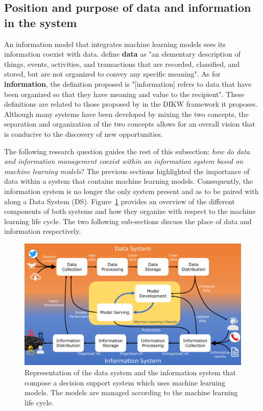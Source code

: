 \subsection{Position and purpose of data and information in the system}
An information model that integrates machine learning models sees its information coexist with data.
\textcite{rainerIntroductionInformationSystems2021} define \textbf{data} as "an elementary description
of things, events, activities, and transactions that are recorded, classified, and stored,
but are not organized to convey any specific meaning".
As for \textbf{information}, the definition proposed is "[information] refers to data
that have been organized so that they have meaning and value to the recipient".
These definitions are related to those proposed by \textcite{ackoffDataWisdom1989} in the DIKW framework it proposes.
Although many systems have been developed by mixing the two concepts, the separation and
organization of the two concepts allows for an overall vision that is conducive to the discovery of new opportunities.

The following research question guides the rest of this subsection: \textit{how do data and information management coexist within an information system based on machine learning models}?
The previous sections highlighted the importance of data within a system that contains machine learning models.
Consequently, the information system is no longer the only system present and as to be paired with along a Data System (DS).
Figure~\ref{system:ds-is-systems} provides an overview of the different components of both systems and how they organize with respect to the machine learning life cycle.
The two following sub-sections discuss the place of data and information respectively.

\begin{figure}[htb]
    \centering
    \includegraphics[width=\textwidth]{figures/chap-5/data-information-systems.pdf}
    \caption{Representation of the data system and the information system that compose a decision support system which uses machine learning models. The models are managed according to the machine learning life cycle.}
    \label{system:ds-is-systems}
\end{figure}

